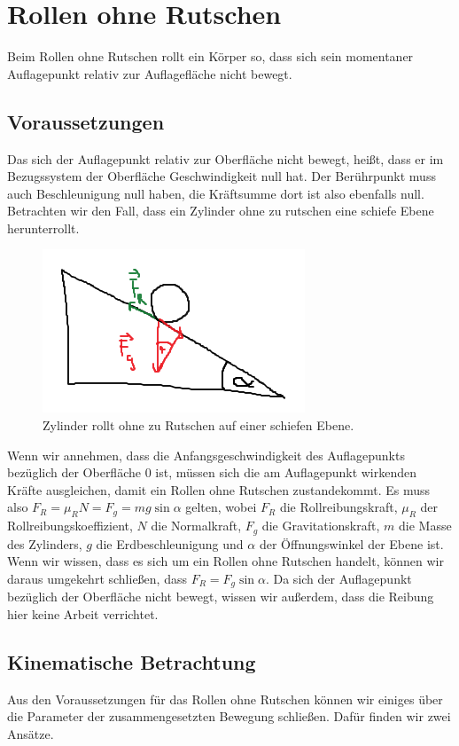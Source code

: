 \documentclass[11pt]{article}
\begin{document}
\section{Rollen ohne Rutschen}
Beim Rollen ohne Rutschen rollt ein Körper so, dass sich sein momentaner Auflagepunkt relativ zur Auflagefläche nicht bewegt. 
\subsection{Voraussetzungen}
Das sich der Auflagepunkt relativ zur Oberfläche nicht bewegt, heißt, dass er im Bezugssystem der Oberfläche Geschwindigkeit null hat. Der Berührpunkt muss auch Beschleunigung null haben, die Kräftsumme dort ist also ebenfalls null. Betrachten wir den Fall, dass ein Zylinder ohne zu rutschen eine schiefe Ebene herunterrollt. 
\begin{figure}[H]
        \centering
        \includegraphics{abb/5-komb-rot-tra-rollen-ohne-rutschen/schiefe-ebene.png}
        \caption{Zylinder rollt ohne zu Rutschen auf einer schiefen Ebene.}
\end{figure}
Wenn wir annehmen, dass die Anfangsgeschwindigkeit des Auflagepunkts bezüglich der Oberfläche 0 ist, müssen sich die am Auflagepunkt wirkenden Kräfte ausgleichen, damit ein Rollen ohne Rutschen zustandekommt. Es muss also $F_R = \mu_RN = F_g = mg \sin\alpha$ gelten, wobei $F_R$ die Rollreibungskraft, $\mu_R$ der Rollreibungskoeffizient, $N$ die Normalkraft, $F_g$ die Gravitationskraft, $m$ die Masse des Zylinders, $g$ die Erdbeschleunigung und $\alpha$ der Öffnungswinkel der Ebene ist. Wenn wir wissen, dass es sich um ein Rollen ohne Rutschen handelt, können wir daraus umgekehrt schließen, dass $F_R = F_g\sin\alpha$. Da sich der Auflagepunkt bezüglich der Oberfläche nicht bewegt, wissen wir außerdem, dass die Reibung hier keine Arbeit verrichtet. \\ 

\pagebreak
\subsection{Kinematische Betrachtung}
Aus den Voraussetzungen für das Rollen ohne Rutschen können wir einiges über die Parameter der zusammengesetzten Bewegung schließen. Dafür finden wir zwei Ansätze. 
\end{document}
